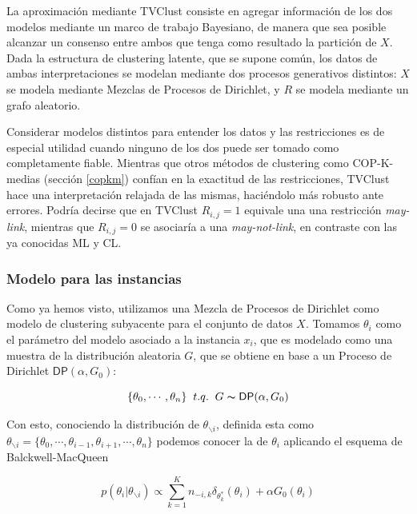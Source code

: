 La aproximación mediante TVClust consiste en agregar información de los dos modelos mediante un marco de trabajo Bayesiano, de manera que sea posible alcanzar un consenso entre ambos que tenga como resultado la partición de $X$. Dada la estructura de clustering latente, que se supone común, los datos de ambas interpretaciones se modelan mediante dos procesos generativos distintos: $X$ se modela mediante Mezclas de Procesos de Dirichlet, y $R$ se modela mediante un grafo aleatorio.

Considerar modelos distintos para entender los datos y las restricciones es de especial utilidad cuando ninguno de los dos puede ser tomado como completamente fiable. Mientras que otros métodos de clustering como COP-K-medias (sección \ref{copkm}) confían en la exactitud de las restricciones, TVClust hace una interpretación relajada de las mismas, haciéndolo más robusto ante errores. Podría decirse que en TVClust $R_{i,j} = 1$ equivale una una restricción \textit{may-link}, mientras que $R_{i,j} = 0$ se asociaría a una \textit{may-not-link}, en contraste con las ya conocidas \acf{ML} y \acf{CL}.

\subsubsection{Modelo para las instancias}

Como ya hemos visto, utilizamos una Mezcla de Procesos de Dirichlet como modelo de clustering subyacente para el conjunto de datos $X$. Tomamos $\theta_i$ como el parámetro del modelo asociado
a la instancia $x_i$, que es modelado como una muestra de la distribución aleatoria $G$, que se obtiene en base a un Proceso de Dirichlet $\mathsf{DP}(\alpha, G_0)$:

\begin{equation}
\{\theta_0, \cdots, \theta_n\} \;\; t.q. \;\; G \thicksim \mathsf{DP}(\alpha, G_0)
\label{eqn44}
\end{equation}

Con esto, conociendo la distribución de $\theta_{\backslash i}$, definida esta como $\theta_{\backslash i} = \{\theta_0, \cdots, \theta_{i-1},\theta_{i+1}, \cdots,\theta_n\}$ podemos conocer la de $\theta_{i}$ aplicando el esquema de Balckwell-MacQueen \cite{Blackwell:1973}

\begin{equation}
p(\theta_{i}|\theta_{\backslash i}) \varpropto \sum_{k = 1}^{K} n_{-i,k} \delta_{\theta_{k}^*}(\theta_{i}) + \alpha G_0(\theta_{i})
\label{eqn45}
\end{equation}

